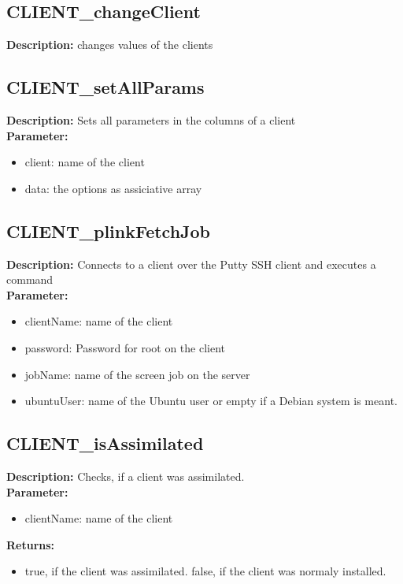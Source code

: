 \subsection{CLIENT\_changeClient}
\textbf{Description:} changes values of the clients\\

\subsection{CLIENT\_setAllParams}
\textbf{Description:} Sets all parameters in the columns of a client\\
\textbf{Parameter:}
\begin{itemize}
\item client: name of the client
\item data: the options as assiciative array
\end{itemize}

\subsection{CLIENT\_plinkFetchJob}
\textbf{Description:} Connects to a client over the Putty SSH client and executes a command\\
\textbf{Parameter:}
\begin{itemize}
\item clientName: name of the client
\item password: Password for root on the client
\item jobName: name of the screen job on the server
\item ubuntuUser: name of the Ubuntu user or empty if a Debian system is meant.
\end{itemize}

\subsection{CLIENT\_isAssimilated}
\textbf{Description:} Checks, if a client was assimilated.\\
\textbf{Parameter:}
\begin{itemize}
\item clientName: name of the client
\end{itemize}
\textbf{Returns:}
\begin{itemize}
\item true, if the client was assimilated. false, if the client was normaly installed.
\end{itemize}

